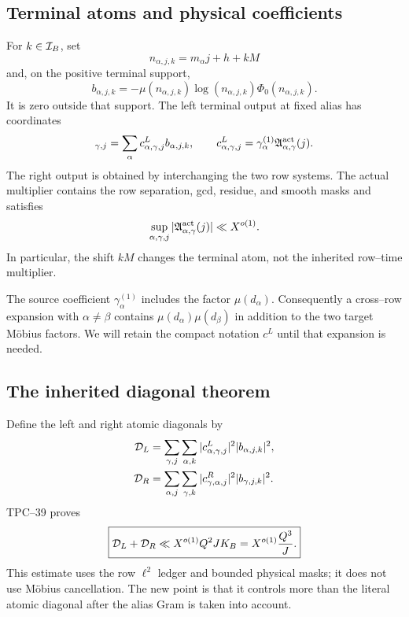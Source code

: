 \subsection{Terminal atoms and physical coefficients}

For \(k\in\mathcal I_B\), set
\begin{equation}
 n_{\alpha,j,k}=m_\alpha j+h+kM
 \label{eq:tpc41-interface-target}
\end{equation}
and, on the positive terminal support,
\begin{equation}
 b_{\alpha,j,k}
 =-\mu(n_{\alpha,j,k})
   \log(n_{\alpha,j,k})\Phi_0(n_{\alpha,j,k}).
 \label{eq:tpc41-interface-b}
\end{equation}
It is zero outside that support.  The left terminal output at fixed alias
has coordinates
\begin{equation}
 [\mathscr T_k^L]_{\gamma,j}
 =\sum_\alpha c^L_{\alpha,\gamma,j}b_{\alpha,j,k},
 \qquad
 c^L_{\alpha,\gamma,j}
 =\gamma_\alpha^{(1)}
  \mathfrak A_{\alpha,\gamma}^{\rm act}(j).
 \label{eq:tpc41-interface-left-output}
\end{equation}
The right output is obtained by interchanging the two row systems.  The
actual multiplier contains the row separation, gcd, residue, and smooth
masks and satisfies
\begin{equation}
 \sup_{\alpha,\gamma,j}
 |\mathfrak A_{\alpha,\gamma}^{\rm act}(j)|
 \ll X^{o(1)}.
 \label{eq:tpc41-interface-multiplier}
\end{equation}
In particular, the shift \(kM\) changes the terminal atom, not the
inherited row--time multiplier.

The source coefficient \(\gamma_\alpha^{(1)}\) includes the factor
\(\mu(d_\alpha)\).  Consequently a cross--row expansion with
\(\alpha\ne\beta\) contains \(\mu(d_\alpha)\mu(d_\beta)\) in addition to
the two target M\"obius factors.  We will retain the compact notation
\(c^L\) until that expansion is needed.

\subsection{The inherited diagonal theorem}

Define the left and right atomic diagonals by
\begin{align}
 \mathcal D_L
 &=\sum_{\gamma,j}\sum_{\alpha,k}
   |c^L_{\alpha,\gamma,j}|^2|b_{\alpha,j,k}|^2,
 \label{eq:tpc41-interface-DL}\\
 \mathcal D_R
 &=\sum_{\alpha,j}\sum_{\gamma,k}
   |c^R_{\gamma,\alpha,j}|^2|b_{\gamma,j,k}|^2.
 \label{eq:tpc41-interface-DR}
\end{align}
TPC--39 proves
\begin{equation}
 \boxed{
 \mathcal D_L+\mathcal D_R
 \ll X^{o(1)}Q^2JK_B
 =X^{o(1)}\frac{Q^3}{J}.}
 \label{eq:tpc41-interface-diagonal-bound}
\end{equation}
This estimate uses the row \(\ell^2\) ledger and bounded physical masks;
it does not use M\"obius cancellation.  The new point is that it controls
more than the literal atomic diagonal after the alias Gram is taken into
account.

